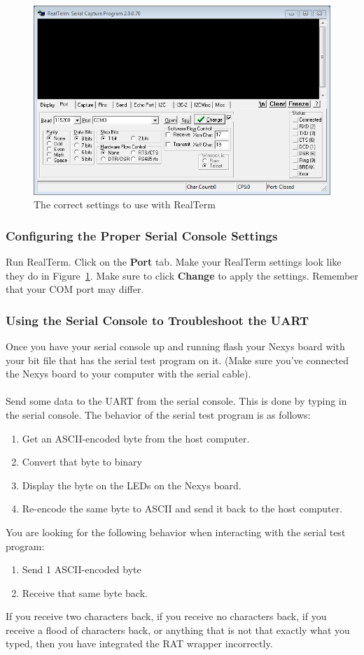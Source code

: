 \documentclass[notitlepage]{article}
\begin{document}
\begin{figure}[ht!]
  \centering
  \includegraphics[width=1\textwidth]{realterm.png}
  \caption{The correct settings to use with RealTerm}
  \label{fig:realterm}
\end{figure}

\subsubsection{Configuring the Proper Serial Console Settings}
Run RealTerm. Click on the \textbf{Port} tab. Make your RealTerm settings look like they do in Figure~\ref{fig:realterm}. Make sure to click \textbf{Change} to apply the settings. Remember that your COM port may differ.

\subsubsection{Using the Serial Console to Troubleshoot the UART}
Once you have your serial console up and running flash your Nexys board with your bit file that has the serial test program on it. (Make sure you've connected the Nexys board to your computer with the serial cable).\\\\
Send some data to the UART from the serial console. This is done by typing in the serial console. The behavior of the serial test program is as follows:
\begin{enumerate}
\item Get an ASCII-encoded byte from the host computer.
\item Convert that byte to binary
\item Display the byte on the LEDs on the Nexys board.
\item Re-encode the same byte to ASCII and send it back to the host computer.
\end{enumerate}
You are looking for the following behavior when interacting with the serial test program:
\begin{enumerate}
\item Send 1 ASCII-encoded byte
\item Receive that same byte back.
\end{enumerate}
If you receive two characters back, if you receive no characters back, if you receive a flood of characters back, or anything that is not that exactly what you typed, then you have integrated the RAT wrapper incorrectly.
\end{document}
